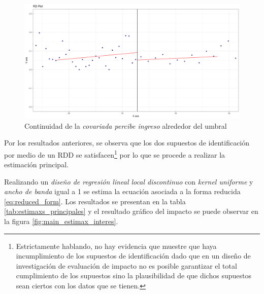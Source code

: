 \documentclass[AER]{AEA}
\begin{document}
\begin{figure}[h!]
    \centering
    \includegraphics[scale = 0.35]{imagenes/estimax_principal/percibe_ingreso_main.png}
    \caption{Continuidad de la \textit{covariada percibe ingreso} alrededor del umbral}
    \label{fig:percibe_ingreso}
\end{figure}

Por los resultados anteriores, se observa que los dos supuestos de identificación por medio de un RDD se satisfacen\footnote{Estrictamente hablando, no hay evidencia que muestre que haya incumplimiento de los supuestos de identificación dado que en un diseño de investigación de evaluación de impacto no es posible garantizar el total cumplimiento de los supuestos sino la plausibilidad de que dichos supuestos sean ciertos con los datos que se tienen.} por lo que se procede a realizar la estimación principal.

Realizando un \textit{diseño de regresión lineal local discontinuo} con \textit{kernel uniforme} y \textit{ancho de banda} igual a 1 se estima la ecuación asociada a la forma reducida \ref{eq:reduced_form}. Los resultados se presentan en la tabla \ref{tab:estimaxs_principales} y el resultado gráfico del impacto se puede observar en la figura \ref{fig:main_estimax_interes}. 
\end{document}
